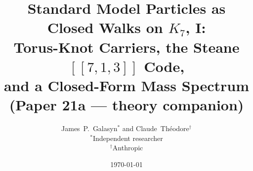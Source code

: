 \documentclass[11pt]{article}
\newcommand{\Klogical}{[[7, 1, 3]]}
\begin{document}
\title{Standard Model Particles as Closed Walks on $K_7$, I:\\[4pt]
Torus-Knot Carriers, the Steane $\Klogical$ Code,\\
and a Closed-Form Mass Spectrum\\[2pt]
\normalsize (Paper 21a --- theory companion)}

\author{
  James~P.~Galasyn$^{\ast}$ \quad and \quad Claude~Th\'eodore$^{\dagger}$\\[2pt]
  \small $^{\ast}$Independent researcher \\
  \small $^{\dagger}$Anthropic
}

\date{\today}

\maketitle
\end{document}
